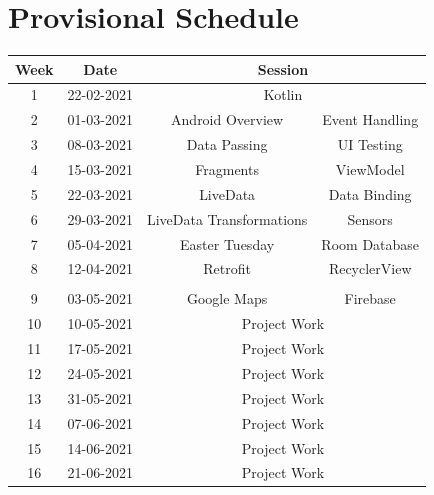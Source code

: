 \documentclass{article}
\begin{document}
\section*{Provisional Schedule}
\renewcommand{\arraystretch}{1.5}
\begin{tabular}{|c|c|c|c|}
	\hline
	\textbf{Week} & \textbf{Date}     & \multicolumn{2}{c|}{\textbf{Session}}          \\ \hline
	\small 1 & \small 22-02-2021 & \multicolumn{2}{c|}{Kotlin}             \\ \hline
	\small 2 & \small 01-03-2021 & Android Overview                  & Event Handling \\ \hline
	\small 3 & \small 08-03-2021 & Data Passing                      & UI Testing     \\ \hline
	\small 4 & \small 15-03-2021 & Fragments                         & ViewModel      \\ \hline
	\small 5 & \small 22-03-2021 & LiveData                          & Data Binding   \\ \hline
	\small 6 & \small 29-03-2021 & LiveData Transformations          & Sensors        \\ \hline
	\small 7 & \small 05-04-2021 & \cellcolor{yellow} Easter Tuesday & Room Database  \\ \hline
	\small 8 & \small 12-04-2021 & Retrofit                          & RecyclerView   \\ \hline
	\rowcolor{yellow} \multicolumn{4}{|c|}{\small Mid Term Break}  \\ \hline
	\small 9 & \small 03-05-2021 & Google Maps                       & Firebase       \\ \hline
	\small 10     & \small 10-05-2021 & \multicolumn{2}{c|}{\small Project Work}        \\ \hline
	\small 11     & \small 17-05-2021 & \multicolumn{2}{c|}{\small Project Work}       \\ \hline
	\small 12     & \small 24-05-2021 & \multicolumn{2}{c|}{\small Project Work}       \\ \hline
	\small 13     & \small 31-05-2021 & \multicolumn{2}{c|}{\small Project Work}       \\ \hline
	\small 14     & \small 07-06-2021 & \multicolumn{2}{c|}{\small Project Work}       \\ \hline
	\small 15     & \small 14-06-2021 & \multicolumn{2}{c|}{\small Project Work}       \\ \hline
	\small 16     & \small 21-06-2021 & \multicolumn{2}{c|}{\small Project Work}       \\ \hline
\end{tabular}
\end{document}
